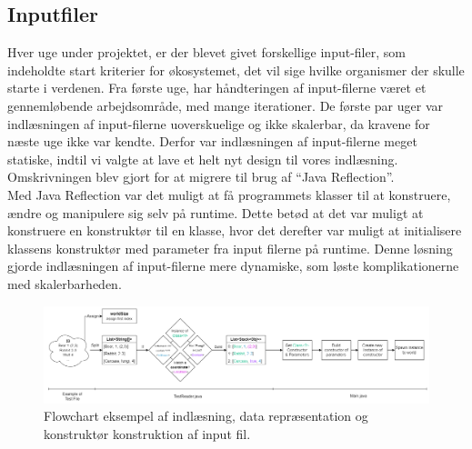 \documentclass[12pt]{article}
\begin{document}
    \subsection{Inputfiler}
    Hver uge under projektet, er der blevet givet forskellige input-filer, som indeholdte start kriterier for økosystemet, det vil sige hvilke organismer der skulle starte i verdenen. Fra første uge, har håndteringen af input-filerne været et gennemløbende arbejdsområde, med mange iterationer. De første par uger var indlæsningen af input-filerne uoverskuelige og ikke skalerbar, da kravene for næste uge ikke var kendte. Derfor var indlæsningen af input-filerne meget statiske, indtil vi valgte at lave et helt nyt design til vores indlæsning. Omskrivningen blev gjort for at migrere til brug af “Java Reflection”.
    \\Med Java Reflection var det muligt at få programmets klasser til at konstruere, ændre og manipulere sig selv på runtime. Dette betød at det var muligt at konstruere en konstruktør til en klasse, hvor det derefter var muligt at initialisere klassens konstruktør med parameter fra input filerne på runtime. Denne løsning gjorde indlæsningen af input-filerne mere dynamiske, som løste komplikationerne med skalerbarheden. 
    \begin{figure}[H]
        \centering
        \includegraphics[width=1\columnwidth]{../TestReader.png}
        \caption{Flowchart eksempel af indlæsning, data repræsentation og konstruktør konstruktion af input fil.}
    \end{figure}
    \newpage
\end{document}
